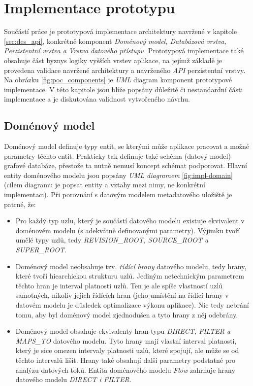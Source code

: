 \chapter{Implementace prototypu}
Součástí práce je prototypová implementace architektury navržené v kapitole \ref{sec:des_api}, konkrétně komponent \textit{Doménový model, Databázová vrstva, Perzistentní vrstva a Vrstva datového přístupu}. Prototypová implementace také obsahuje část byznys logiky vyšších vrstev aplikace, na jejímž základě je provedena validace navržené architektury a navrženého \textit{API} perzistentní vrstvy.  Na obrázku \ref{fig:poc_components} je \textit{UML} diagram komponent prototypové implementace. V této kapitole jsou blíže popsány důležité či nestandardní části implementace a je diskutována validnost vytvořeného návrhu.

\section{Doménový model}
Doménový model definuje typy entit, se kterými může aplikace pracovat a možné parametry těchto entit. Prakticky tak definuje také schéma (datový model) grafové databáze, přestože ta nutně nemusí koncept schémat podporovat. Hlavní entity doménového modelu jsou popsány \textit{ UML diagramem} \ref{fig:impl-domain} (cílem diagramu je popsat entity a vztahy mezi nimy, ne konkrétní implementaci). Při porovnání s datovým modelem metadatového uložiště je patrné, že:

\begin{itemize}
   \item Pro každý typ uzlu, který je součástí datového modelu existuje ekvivalent v doménovém modelu (s adekvátně definovanými parametry). Výjimku tvoří umělé typy uzlů, tedy \textit{REVISION\_ROOT, SOURCE\_ROOT a SUPER\_ROOT}.
   \item Doménový model neobsahuje tzv. \textit{řídící hrany} datového modelu, tedy hrany, které tvoří hiearchickou strukturu uzlů. Jediným netechnickým parametrem těchto hran je interval platnosti uzlů. Ten je ale spíše vlastností uzlů samotných, nikoliv jejich řídících hran (jeho umístění na řídící hrany v datovém modelu je důsledek optimalizace výkonu aplikace). Nic tedy nebrání tomu, aby byl doménový model zjednodušen a tyto hrany z něj odebrány.
   \item Doménový model obsahuje ekvivalenty hran typu \textit{DIRECT, FILTER a MAPS\_TO} datového modelu. Tyto hrany mají vlastní interval platnosti, který je sice omezen intervaly platnosti uzlů, které spojují, ale může se od těchto intervalů lišit. Hrany také obsahují další parametry podstatné pro analýzu datových toků. Entita doménového modelu \textit{Flow} zahrnuje hrany datového modelu \textit{DIRECT i FILTER}.
\end{itemize}



